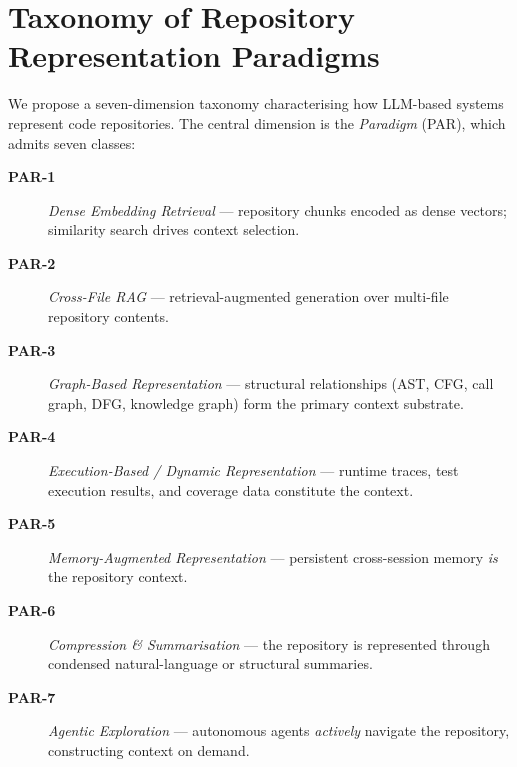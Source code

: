 \section{Taxonomy of Repository Representation Paradigms}\label{sec:taxonomy}

We propose a seven-dimension taxonomy characterising how LLM-based systems
represent code repositories.  The central dimension is the \emph{Paradigm}
(PAR), which admits seven classes:

\begin{description}
  \item[\textbf{PAR-1}] \emph{Dense Embedding Retrieval} --- repository chunks
    encoded as dense vectors; similarity search drives context selection.
  \item[\textbf{PAR-2}] \emph{Cross-File RAG} --- retrieval-augmented generation
    over multi-file repository contents.
  \item[\textbf{PAR-3}] \emph{Graph-Based Representation} --- structural
    relationships (AST, CFG, call graph, DFG, knowledge graph) form the primary
    context substrate.
  \item[\textbf{PAR-4}] \emph{Execution-Based / Dynamic Representation} ---
    runtime traces, test execution results, and coverage data constitute the
    context.
  \item[\textbf{PAR-5}] \emph{Memory-Augmented Representation} --- persistent
    cross-session memory \emph{is} the repository context.
  \item[\textbf{PAR-6}] \emph{Compression \& Summarisation} --- the repository
    is represented through condensed natural-language or structural summaries.
  \item[\textbf{PAR-7}] \emph{Agentic Exploration} --- autonomous agents
    \emph{actively} navigate the repository, constructing context on demand.
\end{description}
